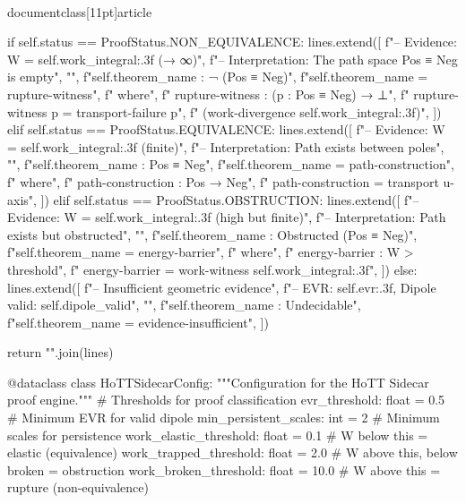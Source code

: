 \\documentclass[11pt]{article}
\begin{document}
\begin{CodeBlock}
        if self.status == ProofStatus.NON_EQUIVALENCE:
            lines.extend([
                f"-- Evidence: W = {self.work_integral:.3f} (→ ∞)",
                f"-- Interpretation: The path space Pos ≡ Neg is empty",
                "",
                f"{self.theorem_name} : ¬ (Pos ≡ Neg)",
                f"{self.theorem_name} = rupture-witness",
                f"  where",
                f"    rupture-witness : (p : Pos ≡ Neg) → ⊥",
                f"    rupture-witness p = transport-failure p",
                f"      (work-divergence {self.work_integral:.3f})",
            ])
        elif self.status == ProofStatus.EQUIVALENCE:
            lines.extend([
                f"-- Evidence: W = {self.work_integral:.3f} (finite)",
                f"-- Interpretation: Path exists between poles",
                "",
                f"{self.theorem_name} : Pos ≡ Neg",
                f"{self.theorem_name} = path-construction",
                f"  where",
                f"    path-construction : Pos → Neg",
                f"    path-construction = transport u-axis",
            ])
        elif self.status == ProofStatus.OBSTRUCTION:
            lines.extend([
                f"-- Evidence: W = {self.work_integral:.3f} (high but finite)",
                f"-- Interpretation: Path exists but obstructed",
                "",
                f"{self.theorem_name} : Obstructed (Pos ≡ Neg)",
                f"{self.theorem_name} = energy-barrier",
                f"  where",
                f"    energy-barrier : W > threshold",
                f"    energy-barrier = work-witness {self.work_integral:.3f}",
            ])
        else:
            lines.extend([
                f"-- Insufficient geometric evidence",
                f"-- EVR: {self.evr:.3f}, Dipole valid: {self.dipole_valid}",
                "",
                f"{self.theorem_name} : Undecidable",
                f"{self.theorem_name} = evidence-insufficient",
            ])

        return "\n".join(lines)


@dataclass
class HoTTSidecarConfig:
    """Configuration for the HoTT Sidecar proof engine."""
    # Thresholds for proof classification
    evr_threshold: float = 0.5            # Minimum EVR for valid dipole
    min_persistent_scales: int = 2        # Minimum scales for persistence
    work_elastic_threshold: float = 0.1   # W below this = elastic (equivalence)
    work_trapped_threshold: float = 2.0   # W above this, below broken = obstruction
    work_broken_threshold: float = 10.0   # W above this = rupture (non-equivalence)


\end{CodeBlock}
\end{document}
